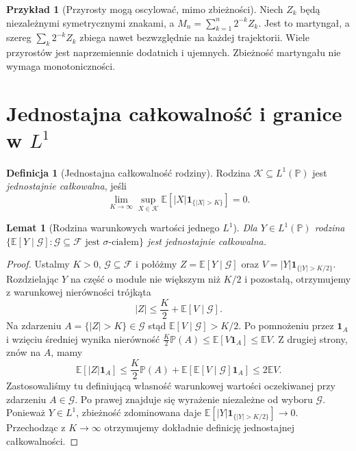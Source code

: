 \documentclass[11pt,a4paper,oneside]{report}
\numberwithin{equation}{chapter}
\theoremstyle{plain}
\newtheorem{lemat}[twierdzenie]{Lemat}
\theoremstyle{definition}
\newtheorem{definicja}{Definicja}[chapter]
\newtheorem{przyklad}{Przykład}[chapter]
\theoremstyle{remark}
\newcommand{\Prob}{\mathbb{P}}
\newcommand{\E}{\mathbb{E}}
\newcommand{\ind}[1]{\mathbf{1}_{#1}}
\begin{document}
\begin{przyklad}[Przyrosty mogą oscylować, mimo zbieżności]
Niech $Z_k$ będą niezależnymi symetrycznymi znakami,
a $M_n=\sum_{k=1}^n2^{-k}Z_k$.
Jest to martyngał, a szereg
$\sum_k2^{-k}Z_k$ zbiega nawet bezwzględnie
na każdej trajektorii. Wiele przyrostów jest
naprzemiennie dodatnich i ujemnych.
Zbieżność martyngału nie wymaga monotoniczności.
\end{przyklad}

\section{Jednostajna całkowalność i granice w \texorpdfstring{$L^1$}{L1}}

\begin{definicja}[Jednostajna całkowalność rodziny]
Rodzina $\mathcal K\subseteq L^1(\Prob)$ jest
\emph{jednostajnie całkowalna}, jeśli
\[
\lim_{K\to\infty}\sup_{X\in\mathcal K}
\E[|X|\ind{\{|X|>K\}}]=0.
\]
\end{definicja}

\begin{lemat}[Rodzina warunkowych wartości jednego $L^1$]
Dla $Y\in L^1(\Prob)$ rodzina
$\{\E[Y\mid\mathcal G]:\mathcal G\subseteq\mathcal F
\text{ jest }\sigma\text{-ciałem}\}$
jest jednostajnie całkowalna.
\end{lemat}
\begin{proof}
Ustalmy $K>0$, $\mathcal G\subseteq\mathcal F$
i połóżmy $Z=\E[Y\mid\mathcal G]$ oraz
$V=|Y|\ind{\{|Y|>K/2\}}$.
Rozdzielając $Y$ na część o module nie większym
niż $K/2$ i pozostałą, otrzymujemy z warunkowej
nierówności trójkąta
\[
|Z|\leq\frac K2+\E[V\mid\mathcal G].
\]
Na zdarzeniu $A=\{|Z|>K\}\in\mathcal G$
stąd $\E[V\mid\mathcal G]>K/2$.
Po pomnożeniu przez $\ind A$ i wzięciu średniej
wynika nierówność
$\frac K2\Prob(A)\leq\E[V\ind A]\leq\E V$.
Z drugiej strony, znów na $A$, mamy
\[
\E[|Z|\ind A]
\leq\frac K2\Prob(A)
 +\E[\E[V\mid\mathcal G]\ind A]
\leq2\E V.
\]
Zastosowaliśmy tu definiującą własność
warunkowej wartości oczekiwanej przy zdarzeniu
$A\in\mathcal G$. Po prawej znajduje się
wyrażenie niezależne od wyboru $\mathcal G$.
Ponieważ $Y\in L^1$, zbieżność zdominowana daje
$\E[|Y|\ind{\{|Y|>K/2\}}]\to0$.
Przechodząc z $K\to\infty$ otrzymujemy dokładnie
definicję jednostajnej całkowalności.
\end{proof}
\end{document}
